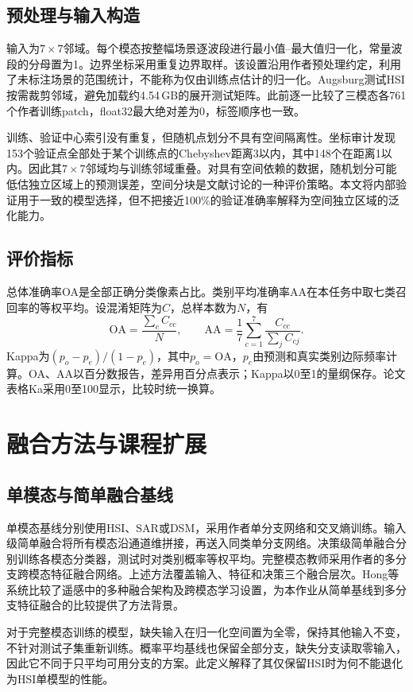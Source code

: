 \documentclass[conference,10pt]{IEEEtran}
\begin{document}
\subsection{预处理与输入构造}
输入为$7\times7$邻域。每个模态按整幅场景逐波段进行最小值--最大值归一化，常量波段的分母置为1。边界坐标采用重复边界取样。该设置沿用作者预处理约定，利用了未标注场景的范围统计，不能称为仅由训练点估计的归一化。Augsburg测试HSI按需裁剪邻域，避免加载约4.54\,GB的展开测试矩阵。此前逐一比较了三模态各761个作者训练patch，float32最大绝对差为0，标签顺序也一致。

训练、验证中心索引没有重复，但随机点划分不具有空间隔离性。坐标审计发现153个验证点全部处于某个训练点的Chebyshev距离3以内，其中148个在距离1以内。因此其$7\times7$邻域均与训练邻域重叠。对具有空间依赖的数据，随机划分可能低估独立区域上的预测误差，空间分块是文献讨论的一种评价策略\cite{roberts2017}。本文将内部验证用于一致的模型选择，但不把接近100\%的验证准确率解释为空间独立区域的泛化能力。

\subsection{评价指标}
总体准确率OA是全部正确分类像素占比。类别平均准确率AA在本任务中取七类召回率的等权平均。设混淆矩阵为$C$，总样本数为$N$，有
\begin{equation}
 \mathrm{OA}=\frac{\sum_c C_{cc}}{N},\qquad
 \mathrm{AA}=\frac1{7}\sum_{c=1}^{7}\frac{C_{cc}}{\sum_j C_{cj}}.
\end{equation}
Kappa为$(p_o-p_e)/(1-p_e)$，其中$p_o=\mathrm{OA}$，$p_e$由预测和真实类别边际频率计算。OA、AA以百分数报告，差异用百分点表示；Kappa以0至1的量纲保存。论文表格Ka采用0至100显示，比较时统一换算。

\section{融合方法与课程扩展}
\subsection{单模态与简单融合基线}
单模态基线分别使用HSI、SAR或DSM，采用作者单分支网络和交叉熵训练。输入级简单融合将所有模态沿通道维拼接，再送入同类单分支网络。决策级简单融合分别训练各模态分类器，测试时对类别概率等权平均。完整模态教师采用作者的多分支跨模态特征融合网络。上述方法覆盖输入、特征和决策三个融合层次。Hong等系统比较了遥感中的多种融合架构及跨模态学习设置\cite{hong2021mdl}，为本作业从简单基线到多分支特征融合的比较提供了方法背景。

对于完整模态训练的模型，缺失输入在归一化空间置为全零，保持其他输入不变，不针对测试子集重新训练。概率平均基线也保留全部分支，缺失分支读取零输入，因此它不同于只平均可用分支的方案。此定义解释了其仅保留HSI时为何不能退化为HSI单模型的性能。
\end{document}
